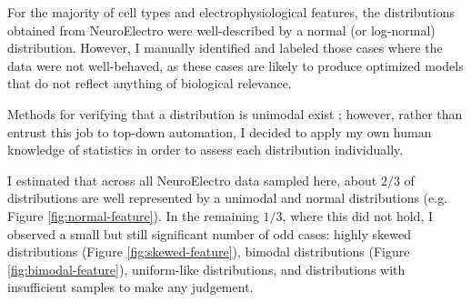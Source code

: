 %
For the majority of cell types and electrophysiological features, the distributions obtained from NeuroElectro were well-described by a normal (or log-normal) distribution.
However, I manually identified and labeled those cases where the data were not well-behaved, as these cases are likely to produce optimized models that do not reflect anything of biological relevance.

Methods for verifying that a distribution is unimodal exist \citep{maechler2013package}; however, rather than entrust this job to top-down automation, I decided to apply my own human knowledge of statistics in order to assess each distribution individually. %

I estimated that across all NeuroElectro data sampled here, about $2/3$ of distributions are well represented by a unimodal and normal distributions (e.g. Figure \ref{fig:normal-feature}).
In the remaining $1/3$, where this did not hold, I observed a small but still significant number of odd cases: highly skewed distributions (Figure \ref{fig:skewed-feature}), bimodal distributions (Figure \ref{fig:bimodal-feature}), uniform-like distributions, and distributions with insufficient samples to make any judgement.

